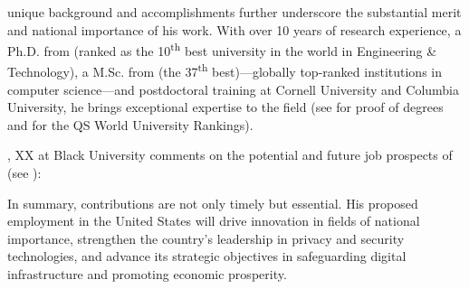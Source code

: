 \drs unique background and accomplishments further underscore the substantial
merit and national importance of his work.
With over 10 years of research experience, a Ph.D. from \epfl (ranked as
the 10\textsuperscript{th} best university in the world in Engineering \&
Technology), a M.Sc. from \kth (the 37\textsuperscript{th} best)---globally
top-ranked institutions in computer science---and postdoctoral training at
Cornell University and Columbia University, he brings exceptional expertise to
the field (see  for proof of \drs degrees and
 for the QS World University Rankings).

\aaa, XX at Black University comments on the potential and future job prospects
of \dr (see ):

\qu{\ldots}

In summary, \drs contributions are not only timely but essential.
His proposed employment in the United States will drive innovation in fields of
national importance, strengthen the country's leadership in privacy and security
technologies, and advance its strategic objectives in safeguarding digital
infrastructure and promoting economic prosperity.